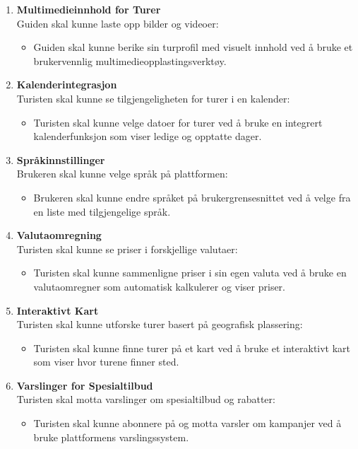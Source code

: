 \documentclass[../doc.tex]{subfiles}
\begin{document}
\begin{enumerate}
    \item \textbf{Multimedieinnhold for Turer} \\
    Guiden skal kunne laste opp bilder og videoer:
    \begin{itemize}
        \item Guiden skal kunne berike sin turprofil med visuelt innhold ved å bruke et brukervennlig multimedieopplastingsverktøy.
    \end{itemize}

    \item \textbf{Kalenderintegrasjon} \\
    Turisten skal kunne se tilgjengeligheten for turer i en kalender:
    \begin{itemize}
        \item Turisten skal kunne velge datoer for turer ved å bruke en integrert kalenderfunksjon som viser ledige og opptatte dager.
    \end{itemize}

    \item \textbf{Språkinnstillinger} \\
    Brukeren skal kunne velge språk på plattformen:
    \begin{itemize}
        \item Brukeren skal kunne endre språket på brukergrensesnittet ved å velge fra en liste med tilgjengelige språk.
    \end{itemize}

    \item \textbf{Valutaomregning} \\
    Turisten skal kunne se priser i forskjellige valutaer:
    \begin{itemize}
        \item Turisten skal kunne sammenligne priser i sin egen valuta ved å bruke en valutaomregner som automatisk kalkulerer og viser priser.
    \end{itemize}

    \item \textbf{Interaktivt Kart} \\
    Turisten skal kunne utforske turer basert på geografisk plassering:
    \begin{itemize}
        \item Turisten skal kunne finne turer på et kart ved å bruke et interaktivt kart som viser hvor turene finner sted.
    \end{itemize}

    \item \textbf{Varslinger for Spesialtilbud} \\
    Turisten skal motta varslinger om spesialtilbud og rabatter:
    \begin{itemize}
        \item Turisten skal kunne abonnere på og motta varsler om kampanjer ved å bruke plattformens varslingssystem.
    \end{itemize}


\end{enumerate}
\end{document}
